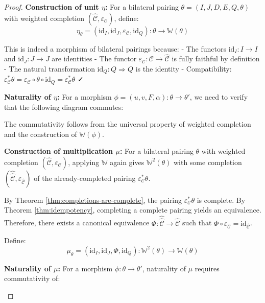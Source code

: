 \documentclass[11pt]{article}
\theoremstyle{plain}
\theoremstyle{definition}
\theoremstyle{remark}
\newcommand{\C}{\mathcal{C}}
\newcommand{\id}{\mathrm{id}}
\newcommand{\wh}[1]{\widehat{#1}}
\begin{document}
\begin{proof}
\textbf{Construction of unit $\eta$:}
For a bilateral pairing $\theta = (I, J, D, E, Q, \theta)$ with weighted completion $(\wh{\C}, \varepsilon_\C)$, define:
$$\eta_\theta = (\id_I, \id_J, \varepsilon_\C, \id_Q) : \theta \to \mathbb{W}(\theta)$$

This is indeed a morphism of bilateral pairings because:
- The functors $\id_I : I \to I$ and $\id_J : J \to J$ are identities
- The functor $\varepsilon_\C : \C \to \wh{\C}$ is fully faithful by definition
- The natural transformation $\id_Q : Q \Rightarrow Q$ is the identity
- Compatibility: $\varepsilon_\C^* \theta = \varepsilon_\C \circ \theta \circ \id_Q = \varepsilon_\C^* \theta$ ✓

\textbf{Naturality of $\eta$:}
For a morphism $\phi = (u, v, F, \alpha) : \theta \to \theta'$, we need to verify that the following diagram commutes:
\begin{center}
\end{center}

The commutativity follows from the universal property of weighted completion and the construction of $\mathbb{W}(\phi)$.

\textbf{Construction of multiplication $\mu$:}
For a bilateral pairing $\theta$ with weighted completion $(\wh{\C}, \varepsilon_\C)$, applying $\mathbb{W}$ again gives $\mathbb{W}^2(\theta)$ with some completion $(\wh{\wh{\C}}, \varepsilon_{\wh{\C}})$ of the already-completed pairing $\varepsilon_\C^* \theta$.

By Theorem \ref{thm:completions-are-complete}, the pairing $\varepsilon_\C^* \theta$ is complete. By Theorem \ref{thm:idempotency}, completing a complete pairing yields an equivalence. Therefore, there exists a canonical equivalence $\Phi : \wh{\wh{\C}} \to \wh{\C}$ such that $\Phi \circ \varepsilon_{\wh{\C}} = \id_{\wh{\C}}$.

Define: $$\mu_\theta = (\id_I, \id_J, \Phi, \id_Q) : \mathbb{W}^2(\theta) \to \mathbb{W}(\theta)$$

\textbf{Naturality of $\mu$:}
For a morphism $\phi : \theta \to \theta'$, naturality of $\mu$ requires commutativity of:
\begin{center}
\end{center}


\end{proof}
\end{document}
